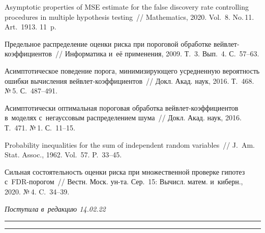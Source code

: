\begin{multicols}{2}
{{\begin{thebibliography}{99}
 Asymptotic properties of MSE 
estimate for the false discovery rate controlling procedures in multiple 
hypothesis testing~// Mathematics,  2020. Vol.~8. No.\,11. Art.~1913. 11~p.

 Предельное распределение оценки риска при пороговой 
обработке вейв\-лет-ко\-эф\-фи\-ци\-ен\-тов~// Информатика и~её применения, 2009. Т.~3. 
Вып.~4. С.~57--63.

 Асимптотическое поведение порога, 
минимизирующего усредненную вероятность ошибки вычисления вейв\-лет-ко\-эф\-фи\-ци\-ен\-тов~// 
Докл. Акад. наук, 2016. Т.~468. №\,5. С.~487--491.

 Асимптотически оптимальная пороговая 
обработка вейв\-лет-ко\-эф\-фи\-ци\-ен\-тов в~моделях с~негауссовым распределением шума~// 
Докл. Акад. наук, 2016. Т.~471. №\,1. С.~11--15.

 Probability inequalities for the sum of independent random 
variables~// J.~Am. Stat. Assoc., 1962. Vol.~57. P.~33--45.

 Сильная состоятельность оценки риска при множественной 
проверке гипотез с~FDR-по\-ро\-гом~// Вестн. Моск. ун-та. Сер.~15: Вычисл. матем. 
и~киберн., 2020. №\,4. C.~34--39.
\end{thebibliography}

 }
 }
 

\end{multicols}

\vspace*{-3pt}

\hfill{\small\textit{Поступила в~редакцию 14.02.22}}

\vspace*{8pt}




\hrule

\vspace*{2pt}

\hrule


\def\tit{THE USE OF THE FDR METHOD OF~MULTIPLE HYPOTHESIS TESTING 
WHEN INVERTING LINEAR HOMOGENEOUS OPERATORS}



